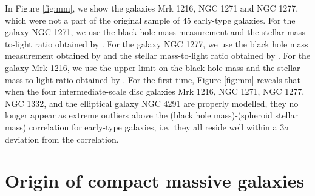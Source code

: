 \documentclass[useAMS,usenatbib,article]{mnras}
\begin{document}
In Figure \ref{fig:mm}, we show the galaxies Mrk 1216, NGC 1271 and NGC 1277, 
which were not a part of the original sample of 45 early-type galaxies.
For the galaxy NGC 1271, we use the black hole mass measurement 
and the stellar mass-to-light ratio obtained by \cite{walsh2015}. 
For the galaxy NGC 1277, we use the black hole mass measurement obtained by \cite{vandenbosch2012} 
and the stellar mass-to-light ratio obtained by \cite{martinnavarro2015}. 
For the galaxy Mrk 1216, we use the upper limit on the black hole mass 
and the stellar mass-to-light ratio obtained by \cite{yildirim2015}. 
For the first time, Figure \ref{fig:mm} reveals that when the four intermediate-scale disc galaxies Mrk 1216, NGC 1271, NGC 1277, NGC 1332, 
and the elliptical galaxy NGC 4291 are properly modelled, 
they no longer appear as extreme outliers above the (black hole mass)-(spheroid stellar mass) correlation for early-type galaxies, 
i.e.~they all reside well within a $3\sigma$ deviation from the correlation.


\section{Origin of compact massive galaxies}
\label{sec:disc}
\end{document}
